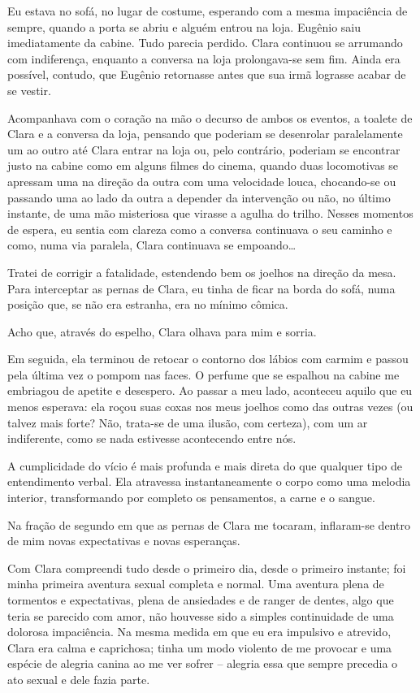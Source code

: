 Eu estava no sofá, no lugar de costume, esperando com a mesma impaciência de sempre, quando a porta se abriu e alguém entrou na loja. Eugênio saiu imediatamente da cabine. Tudo parecia perdido. Clara continuou se arrumando com indiferença, enquanto a conversa na loja prolongava-se sem fim. Ainda era possível, contudo, que Eugênio retornasse antes que sua irmã lograsse acabar de se vestir.

Acompanhava com o coração na mão o decurso de ambos os eventos, a toalete de Clara e a conversa da loja, pensando que poderiam se desenrolar paralelamente um ao outro até Clara entrar na loja ou, pelo contrário, poderiam se encontrar justo na cabine como em alguns filmes do cinema, quando duas locomotivas se apressam uma na direção da outra com uma velocidade louca, chocando-se ou passando uma ao lado da outra a depender da intervenção ou não, no último instante, de uma mão misteriosa que virasse a agulha do trilho. Nesses momentos de espera, eu sentia com clareza como a conversa continuava o seu caminho e como, numa via paralela, Clara continuava se empoando\dots

Tratei de corrigir a fatalidade, estendendo bem os joelhos na direção da mesa. Para interceptar as pernas de Clara, eu tinha de ficar na borda do sofá, numa posição que, se não era estranha, era no mínimo cômica.

Acho que, através do espelho, Clara olhava para mim e sorria.

Em seguida, ela terminou de retocar o contorno dos lábios com carmim e passou pela última vez o pompom nas faces. O perfume que se espalhou na cabine me embriagou de apetite e desespero. Ao passar a meu lado, aconteceu aquilo que eu menos esperava: ela roçou suas coxas nos meus joelhos como das outras vezes (ou talvez mais forte? Não, trata-se de uma ilusão, com certeza), com um ar indiferente, como se nada estivesse acontecendo entre nós.

A cumplicidade do vício é mais profunda e mais direta do que qualquer tipo de entendimento verbal. Ela atravessa instantaneamente o corpo como uma melodia interior, transformando por completo os pensamentos, a carne e o sangue.

Na fração de segundo em que as pernas de Clara me tocaram, inflaram-se dentro de mim novas expectativas e novas esperanças.

Com Clara compreendi tudo desde o primeiro dia, desde o primeiro instante; foi minha primeira aventura sexual completa e normal. Uma aventura plena de tormentos e expectativas, plena de ansiedades e de ranger de dentes, algo que teria se parecido com amor, não houvesse sido a simples continuidade de uma dolorosa impaciência. Na mesma medida em que eu era impulsivo e atrevido, Clara era calma e caprichosa; tinha um modo violento de me provocar e uma espécie de alegria canina ao me ver sofrer -- alegria essa que sempre precedia o ato sexual e dele fazia parte.

